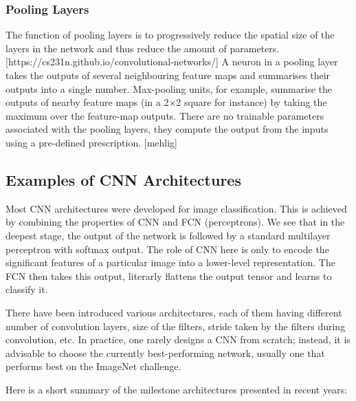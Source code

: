 \subsubsection{Pooling Layers}

The function of pooling layers is to progressively reduce the spatial size of the layers in the network and thus reduce the amount of parameters. [https://cs231n.github.io/convolutional-networks/] A neuron in a pooling layer takes the outputs of several neighbouring feature maps and summarises their outputs into a single number. Max-pooling units, for example, summarise the outputs of nearby feature maps (in a 2×2 square for instance) by taking the maximum over the feature-map outputs. There are no trainable parameters associated with the pooling layers, they compute the output from the inputs using a pre-defined prescription. [mehlig]

\subsection{Examples of CNN Architectures}

Most CNN architectures were developed for image classification. This is achieved by combining the properties of CNN and FCN (perceptrons). We see that in the deepest stage, the output of the network is followed by a standard multilayer perceptron with softmax output. The role of CNN here is only to encode the significant features of a particular image into a lower-level representation. The FCN then takes this output, literarly flattens the output tensor and learns to classify it.

There have been introduced various architectures, each of them having different number of convolution layers, size of the filters, stride taken by the filters during convolution, etc. In practice, one rarely designs a CNN from scratch; instead, it is advisable to choose the currently best-performing network, usually one that performs best on the ImageNet challenge.

Here is a short summary of the milestone architectures presented in recent years:


